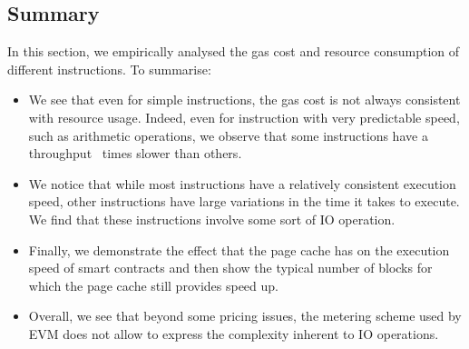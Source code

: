 \subsection{Summary}
In this section, we empirically analysed the gas cost and resource consumption of different instructions. To summarise:
\begin{itemize}
  \item We see that even for simple instructions, the gas cost is not always consistent with resource usage. Indeed, even for instruction with very predictable speed, such as arithmetic operations, we observe that some instructions have a throughput~ times slower than others.
  \item We notice that while most instructions have a relatively consistent execution speed, other instructions have large variations in the time it takes to execute. We find that these instructions involve some sort of IO operation.
  \item Finally, we demonstrate the effect that the page cache has on the execution speed of smart contracts and then show the typical number of blocks for which the page cache still provides speed up.
  \item Overall, we see that beyond some pricing issues, the metering scheme used by EVM does not allow to express the complexity inherent to IO operations.
\end{itemize}
